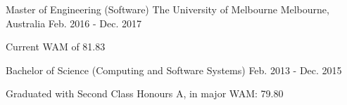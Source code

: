 \begin{cventries}
  \cventrydouble
    {Master of Engineering (Software)}
    {The University of Melbourne}
    {Melbourne, Australia}
    {Feb. 2016 - Dec. 2017}
    {
      \begin{cvitems}
        \item {Current WAM of 81.83}
      \end{cvitems}
    }
    {Bachelor of Science (Computing and Software Systems)}
    {Feb. 2013 - Dec. 2015}
    {
      \begin{cvitems}
        \item {Graduated with Second Class Honours A, in major WAM: 79.80}
      \end{cvitems}
    }
\end{cventries}
\vspace{-5mm}
